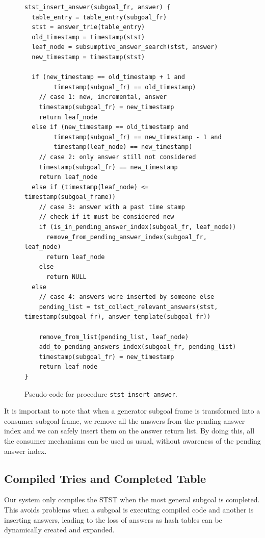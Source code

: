 \begin{figure}[ht]
\begin{Verbatim}
stst_insert_answer(subgoal_fr, answer) {
  table_entry = table_entry(subgoal_fr)
  stst = answer_trie(table_entry)
  old_timestamp = timestamp(stst)
  leaf_node = subsumptive_answer_search(stst, answer)
  new_timestamp = timestamp(stst)
  
  if (new_timestamp == old_timestamp + 1 and
        timestamp(subgoal_fr) == old_timestamp)
    // case 1: new, incremental, answer
    timestamp(subgoal_fr) = new_timestamp
    return leaf_node
  else if (new_timestamp == old_timestamp and
        timestamp(subgoal_fr) == new_timestamp - 1 and
        timestamp(leaf_node) == new_timestamp)
    // case 2: only answer still not considered
    timestamp(subgoal_fr) == new_timestamp
    return leaf_node
  else if (timestamp(leaf_node) <= timestamp(subgoal_frame))
    // case 3: answer with a past time stamp
    // check if it must be considered new
    if (is_in_pending_answer_index(subgoal_fr, leaf_node))
      remove_from_pending_answer_index(subgoal_fr, leaf_node)   
      return leaf_node
    else
      return NULL
  else
    // case 4: answers were inserted by someone else
    pending_list = tst_collect_relevant_answers(stst, timestamp(subgoal_fr), answer_template(subgoal_fr))
    
    remove_from_list(pending_list, leaf_node)
    add_to_pending_answers_index(subgoal_fr, pending_list)
    timestamp(subgoal_fr) = new_timestamp
    return leaf_node
}
\end{Verbatim}
\caption{Pseudo-code for procedure \texttt{stst\_insert\_answer}.}
\label{fig:stst_insert_answer}
\end{figure}

It is important to note that when a generator subgoal frame is transformed into a
consumer subgoal frame, we remove all the answers from the pending answer index
and we can safely insert them on the answer return list. By doing this, all the consumer mechanisms
can be used as usual, without awareness of the pending answer index.

\subsection{Compiled Tries and Completed Table}

Our system only compiles the STST when the most general subgoal is completed.
This avoids problems when a subgoal is executing compiled code and another
is inserting answers, leading to the loss of answers as hash tables can be
dynamically created and expanded.

